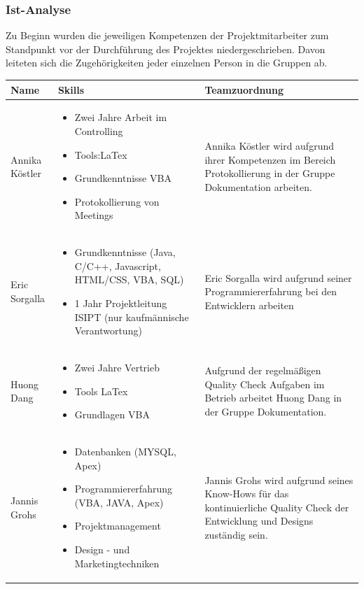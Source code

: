 \documentclass[12pt,a4paper]{article}
\begin{document}
\subsubsection{Ist-Analyse}
Zu Beginn wurden die jeweiligen Kompetenzen der Projektmitarbeiter zum Standpunkt vor der Durchführung des Projektes niedergeschrieben. Davon leiteten sich die Zugehörigkeiten jeder einzelnen Person in die Gruppen ab.\\
\newline

\begin{tabular}{|m{5cm}|m{5cm}|m{5cm}|}
\hline
\textbf {Name} & \textbf {Skills} & \textbf {Teamzuordnung} \\
\hline
\centering Annika Köstler & \begin {itemize}
\item Zwei Jahre Arbeit im Controlling
\item Tools:LaTex
\item Grundkenntnisse VBA
\item Protokollierung von Meetings
\end{itemize}
& Annika Köstler wird aufgrund ihrer Kompetenzen im Bereich Protokollierung in der Gruppe Dokumentation arbeiten.
\\
\hline
\centering Eric Sorgalla & 
\begin {itemize}
\item Grundkenntnisse (Java, C/C++, Javascript, HTML/CSS, VBA, SQL)
\item 1 Jahr Projektleitung ISIPT (nur kaufmännische Verantwortung) 
\end {itemize}
& Eric Sorgalla wird aufgrund seiner Programmiererfahrung bei den Entwicklern arbeiten

\\
\hline
\centering Huong Dang & \begin {itemize}
\item Zwei Jahre Vertrieb
\item Tools LaTex
\item Grundlagen VBA 
\end {itemize}
& Aufgrund der regelmäßigen Quality Check Aufgaben im Betrieb arbeitet Huong Dang in der Gruppe Dokumentation.

\\
\hline
\centering Jannis Grohs & \begin {itemize}
\item Datenbanken (MYSQL, Apex)
\item Programmiererfahrung (VBA, JAVA, Apex)
\item Projektmanagement 
\item Design - und Marketingtechniken
\end {itemize}
& Jannis Grohs wird aufgrund seines Know-Hows für das kontinuierliche Quality Check der Entwicklung und Designs zuständig sein.


\end{tabular}
\end{document}
